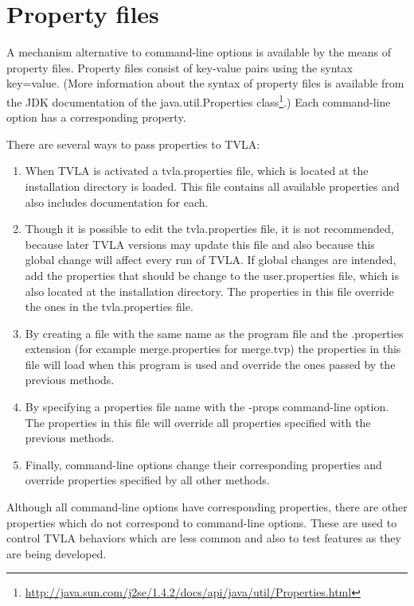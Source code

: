 \section{Property files}
\label{Se:PropertyFiles}

A mechanism alternative to command-line options is available by
the means of property files. Property files consist of key-value
pairs using the syntax key=value. (More information about the
syntax of property files is available from the JDK documentation
of the java.util.Properties
class\footnote{\url{http://java.sun.com/j2se/1.4.2/docs/api/java/util/Properties.html}}.)
Each command-line option has a corresponding property.

There are several ways to pass properties to TVLA:
\begin{enumerate}
\item When TVLA is activated a tvla.properties file, which is
located at the installation directory is loaded. This file
contains all available properties and also includes documentation
for each.

\item Though it is possible to edit the tvla.properties file, it
is not recommended, because later TVLA versions may update this
file and also because this global change will affect every run of
TVLA.
%
If global changes are intended, add the properties that should be
change to the user.properties file, which is also located at the
installation directory. The properties in this file override the
ones in the tvla.properties file.

\item By creating a file with the same name as the program file
and the .properties extension (for example merge.properties for
merge.tvp) the properties in this file will load when this program
is used and override the ones passed by the previous methods.

\item By specifying a properties file name with the -props
command-line option. The properties in this file will override all
properties specified with the previous methods.


\item Finally, command-line options change their corresponding
properties and override properties specified by all other methods.
\end{enumerate}

Although all command-line options have corresponding properties,
there are other properties which do not correspond to command-line
options.  These are used to control TVLA behaviors which are less
common and also to test features as they are being developed.
